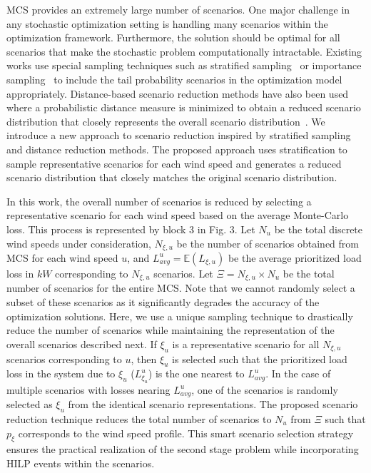 MCS provides an extremely large number of scenarios. One major challenge in any stochastic optimization setting is handling many scenarios within the optimization framework. Furthermore, the solution should be optimal for all scenarios that make the stochastic problem computationally intractable. Existing works use special sampling techniques such as stratified sampling~\cite{parsons2014stratified} or importance sampling~\cite{ekblom2020importance} to include the tail probability scenarios in the optimization model appropriately. Distance-based scenario reduction methods have also been used where a probabilistic distance measure is minimized to obtain a reduced scenario distribution that closely represents the overall scenario distribution~\cite{heitsch2007note}. We introduce a new approach to scenario reduction inspired by stratified sampling and distance reduction methods. The proposed approach uses stratification to sample representative scenarios for each wind speed and generates a reduced scenario distribution that closely matches the original scenario distribution.

In this work, the overall number of scenarios is reduced by selecting a representative scenario for each wind speed based on the average Monte-Carlo loss. This process is represented by block 3 in Fig. 3. Let $N_u$ be the total discrete wind speeds under consideration, $N_{\xi,u}$ be the number of scenarios obtained from MCS for each wind speed $u$, and $L^{u}_{avg} = \mathbb{E}(L_{\xi,u})$ be the average prioritized load loss in $kW$ corresponding to $N_{\xi,u}$ scenarios. Let $\Xi = N_{\xi,u} \times N_u$ be the total number of scenarios for the entire MCS. Note that we cannot randomly select a subset of these scenarios as it significantly degrades the accuracy of the optimization solutions. Here, we use a unique sampling technique to drastically reduce the number of scenarios while maintaining the representation of the overall scenarios described next. If $\xi_u$ is a representative scenario for all $N_{\xi,u}$ scenarios corresponding to $u$, then $\xi_u$ is selected such that the prioritized load loss in the system due to $\xi_u$ ($L^{u}_{\xi_u}$) is the one nearest to $L^{u}_{avg}$. In the case of multiple scenarios with losses nearing $L^{u}_{avg}$, one of the scenarios is randomly selected as $\xi_u$ from the identical scenario representations. The proposed scenario reduction technique reduces the total number of scenarios to $N_u$ from $\Xi$ such that $p_\xi$ corresponds to the wind speed profile. This smart scenario selection strategy ensures the practical realization of the second stage problem while incorporating HILP events within the scenarios. 

